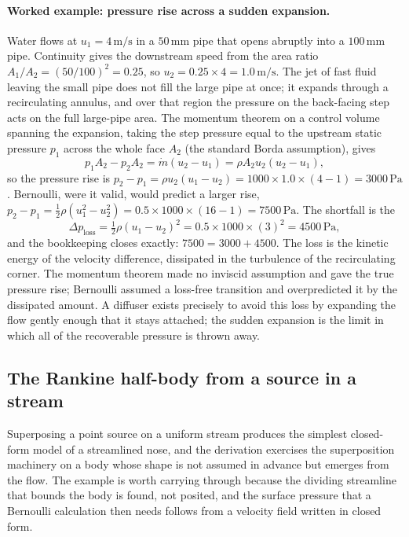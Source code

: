 \paragraph{Worked example: pressure rise across a sudden expansion.}
Water flows at $u_1 = 4\,\si{\meter\per\second}$ in a
$50\,\si{\milli\meter}$ pipe that opens abruptly into a
$100\,\si{\milli\meter}$ pipe. Continuity gives the downstream speed
from the area ratio $A_1/A_2 = (50/100)^2 = 0.25$, so $u_2 = 0.25\times
4 = 1.0\,\si{\meter\per\second}$. The jet of fast fluid leaving the
small pipe does not fill the large pipe at once; it expands through a
recirculating annulus, and over that region the pressure on the
back-facing step acts on the full large-pipe area. The momentum
theorem on a control volume spanning the expansion, taking the step
pressure equal to the upstream static pressure $p_1$ across the whole
face $A_2$ (the standard Borda assumption), gives
\[
p_1 A_2 - p_2 A_2 = \dot m(u_2 - u_1) = \rho A_2 u_2 (u_2 - u_1),
\]
so the pressure rise is $p_2 - p_1 = \rho u_2(u_1 - u_2) = 1000\times
1.0\times(4 - 1) = 3000\,\text{Pa}$. Bernoulli, were it valid, would
predict a larger rise, $p_2 - p_1 = \tfrac12\rho(u_1^2 - u_2^2) =
0.5\times 1000\times(16 - 1) = 7500\,\text{Pa}$. The shortfall is the
\[
\Delta p_\text{loss} = \tfrac12\rho(u_1 - u_2)^2 = 0.5\times 1000\times
(3)^2 = 4500\,\text{Pa},
\]
and the bookkeeping closes exactly: $7500 = 3000 + 4500$. The loss is
the kinetic energy of the velocity difference, dissipated in the
turbulence of the recirculating corner. The momentum theorem made no
inviscid assumption and gave the true pressure rise; Bernoulli assumed
a loss-free transition and overpredicted it by the dissipated amount.
A diffuser exists precisely to avoid this loss by expanding the flow
gently enough that it stays attached; the sudden expansion is the limit
in which all of the recoverable pressure is thrown away.

\subsection{The Rankine half-body from a source in a stream}

Superposing a point source on a uniform stream produces the simplest
closed-form model of a streamlined nose, and the derivation exercises
the superposition machinery on a body whose shape is not assumed in
advance but emerges from the flow. The example is worth carrying
through because the dividing streamline that bounds the body is found,
not posited, and the surface pressure that a Bernoulli calculation
then needs follows from a velocity field written in closed form.

